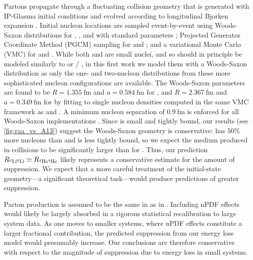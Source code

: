 \documentclass[%
 reprint,
 amsmath,amssymb,
 aps,
 prl,nofootinbib,
 superscriptaddress
]{revtex4-2}
\begin{document}
Partons propagate through a fluctuating collision geometry \cite{Schenke:2020mbo} that is generated with IP-Glasma initial conditions \cite{Schenke:2012wb, Schenke:2012hg} and evolved according to longitudinal Bjorken expansion \cite{Bjorken:1982qr}. Initial nucleon locations are sampled event-by-event using Woods-Saxon distributions for \pb{}, \au{}, and \xe{} with standard parameters \cite{Schenke:2020mbo}; Projected Generator Coordinate Method (PGCM) \cite{Frosini:2021sxj,Frosini:2021fjf} sampling for \neon{} and \ox{} \cite{Mantysaari:2025tcg}; and a variational Monte Carlo (VMC) for  \cite{Nagle:2013lja} and  \cite{Carlson:2014vla,Lim:2018huo}. While both \li{} and \bt{} are small nuclei, and so should in principle be modeled similarly to \he{} or \neon{} / \ox{}, in this first work we model them with a Woods-Saxon distribution as only the one- and two-nucleon distributions from these more sophisticated nucleon configurations are available. The Woods-Saxon parameters are found to be $R = 1.355 ~\mathrm{fm}$ and $a = 0.584 ~\mathrm{fm}$ for \li, and $R = 2.367 ~\mathrm{fm}$ and $a = 0.349 ~\mathrm{fm}$ for \bt{} by fitting to single nucleon densities computed in the same VMC framework as  and  \cite{Wiringa:2013ala}. A minimum nucleon separation of $0.9 ~\mathrm{fm}$ is enforced for all Woods-Saxon implementations \cite{Schenke:2020mbo}. 
Since  is small and tightly bound, our results (see \cref{fig:raa_vs_A13}) suggest the Woods-Saxon geometry is conservative: \li{} has $50\%$ more nucleons than  and is less tightly bound, so we expect the medium produced in \li{} collisions to be significantly larger than for . Thus, our prediction $R_{{}^6\mathrm{Li} {}^6\mathrm{Li}} \simeq R_{{}^{4}\mathrm{He} {}^{4}\mathrm{He}}$ likely represents a conservative estimate for the amount of suppression.
We expect that a more careful treatment of the initial-state geometry---a significant theoretical task---would produce predictions of greater suppression. 

Parton production is assumed to be the same in \pp{} as in \aaa{}. Including nPDF effects would likely be largely absorbed in a rigorous statistical recalibration to large system data. As one moves to smaller systems, where nPDF effects constitute a larger fractional contribution, the predicted suppression from our energy loss model would presumably increase. Our conclusions are therefore conservative with respect to the magnitude of suppression due to energy loss in small systems.
\end{document}
